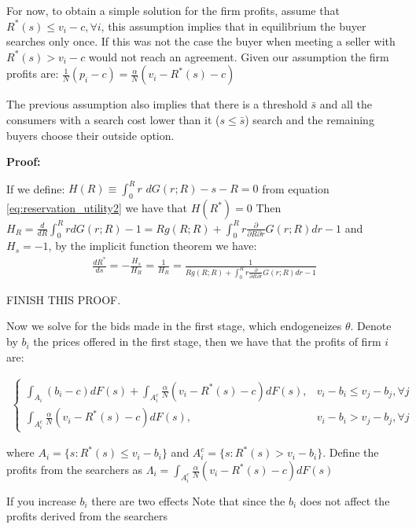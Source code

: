 \documentclass[12pt]{article}
\theoremstyle{plain}
\theoremstyle{plain}
\begin{document}
For now, to obtain a simple solution for the firm profits, assume that $R^*(s) \leq v_i-c, \forall i$, this assumption implies that in equilibrium the buyer searches only once. If this was not the case the buyer when meeting a seller with $R^*(s) > v_i-c$ would not reach an agreement. Given our assumption the firm profits are: 
$\frac{1}{N} (p_i-c) =\frac{\alpha}{N} ( v_i - R^*(s)- c)$

The previous assumption also implies that there is a threshold $\bar{s}$ and all the consumers with a search cost lower than it ($s\leq\bar{s}$) search and the remaining buyers choose their outside option. 

\textbf{Proof:}

If we define: $H(R)\equiv  \int_0^{R} r \, \, dG(r; R) -s - R = 0 $ from equation \ref{eq:reservation_utility2} we have that $H({R^*}) =0$
Then $H_R = \frac{d}{dR} \int_0^R r dG(r;R) -1= R g(R;R)+\int_0^R r \frac{\partial }{\partial R \partial r}G(r;R) dr-1$ and $H_s = -1$, by the implicit function theorem we have:
\begin{align*}
    \frac{dR^*}{ds}= - \frac{H_s}{H_R} = \frac{1}{H_R} = \frac{1}{ R g(R;R)+\int_0^R r \frac{\partial }{\partial R \partial r}G(r;R) dr-1}
\end{align*}

FINISH THIS PROOF. 

\vspace{2cm}


Now we solve for the bids made in the first stage, which endogeneizes $\theta$. Denote by $b_i$ the prices offered in the first stage, then we have that the profits of firm $i$ are: 

\begin{align*}
\begin{cases}
           \int_{A_i} (b_i-c) dF(s) + \int_{A_i^c} \frac{\alpha}{N} ( v_i - R^*(s)- c) dF(s), & v_i - b_i \leq v_j - b_j, \forall j \\
           \int_{A_i^c} \frac{\alpha}{N} ( v_i - R^*(s)- c) dF(s) , &  v_i - b_i > v_j - b_j, \forall j
\end{cases}
\end{align*}

where $A_i = \{s: R^*(s) \leq v_i-b_i\}$ and $A_i^c = \{s: R^*(s) > v_i-b_i\}$. Define the profits from the searchers as $\Lambda_i = \int_{A_i^c} \frac{\alpha}{N} ( v_i - R^*(s)- c) dF(s)$

\vspace{2cm}

If you increase $b_i$ there are two effects 
Note that since the $b_i$ does not affect the profits derived from the searchers
\end{document}

